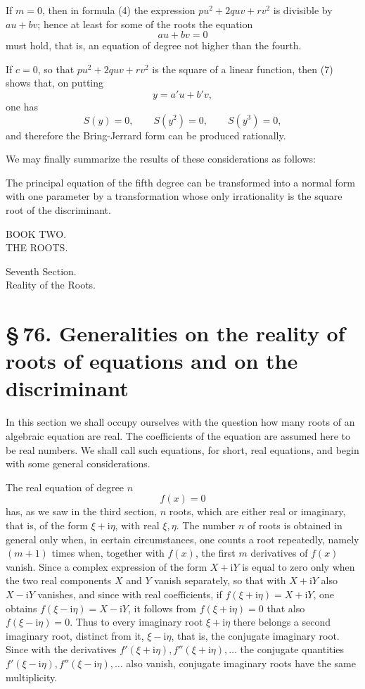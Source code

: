 \documentclass[11pt]{article}
\providecommand{\ii}{\mathrm{i}}
\providecommand{\sect}[2]{\section*{\S\,#1. #2}}
\begin{document}
If $m=0$, then in formula (4) the expression $pu^2+2quv+rv^2$ is divisible by $au+bv$; hence at least for some of the roots the equation
\[
 au+bv=0
\]
must hold, that is, an equation of degree not higher than the fourth.

If $c=0$, so that $pu^2+2quv+rv^2$ is the square of a linear function, then (7) shows that, on putting
\[
 y=a'u+b'v,
\]
one has
\[
 S(y)=0,
 \qquad S(y^2)=0,
 \qquad S(y^3)=0,
\]
and therefore the Bring-Jerrard form can be produced rationally.

We may finally summarize the results of these considerations as follows:

The principal equation of the fifth degree can be transformed into a normal form with one parameter by a transformation whose only irrationality is the square root of the discriminant.






\begin{center}
{\Large BOOK TWO.}\\[1.6em]
{\LARGE THE ROOTS.}
\end{center}
\clearpage

\begin{center}
{\large Seventh Section.}\\[0.6em]
{\Large Reality of the Roots.}
\end{center}

\sect{76}{Generalities on the reality of roots of equations and on the discriminant}

In this section we shall occupy ourselves with the question how many roots of an algebraic equation are real. The coefficients of the equation are assumed here to be real numbers. We shall call such equations, for short, real equations, and begin with some general considerations.

The real equation of degree $n$
\[
        f(x)=0
\]
has, as we saw in the third section, $n$ roots, which are either real or imaginary, that is, of the form $\xi+\ii\eta$, with real $\xi,\eta$. The number $n$ of roots is obtained in general only when, in certain circumstances, one counts a root repeatedly, namely $(m+1)$ times when, together with $f(x)$, the first $m$ derivatives of $f(x)$ vanish. Since a complex expression of the form $X+\ii Y$ is equal to zero only when the two real components $X$ and $Y$ vanish separately, so that with $X+\ii Y$ also $X-\ii Y$ vanishes, and since with real coefficients, if $f(\xi+\ii\eta)=X+\ii Y$, one obtains $f(\xi-\ii\eta)=X-\ii Y$, it follows from $f(\xi+\ii\eta)=0$ that also $f(\xi-\ii\eta)=0$. Thus to every imaginary root $\xi+\ii\eta$ there belongs a second imaginary root, distinct from it, $\xi-\ii\eta$, that is, the conjugate imaginary root. Since with the derivatives $f'(\xi+\ii\eta), f''(\xi+\ii\eta),\ldots$ the conjugate quantities $f'(\xi-\ii\eta), f''(\xi-\ii\eta),\ldots$ also vanish, conjugate imaginary roots have the same multiplicity.
\end{document}
